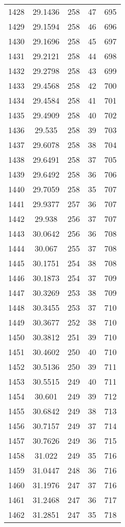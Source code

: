 \documentclass[12pt,a4paper]{article}
\begin{document}
\begin{tabular}{r|cccc}
	1428 & 29.1436 & 258 & 47 & 695 \\
	1429 & 29.1594 & 258 & 46 & 696 \\
	1430 & 29.1696 & 258 & 45 & 697 \\
	1431 & 29.2121 & 258 & 44 & 698 \\
	1432 & 29.2798 & 258 & 43 & 699 \\
	1433 & 29.4568 & 258 & 42 & 700 \\
	1434 & 29.4584 & 258 & 41 & 701 \\
	1435 & 29.4909 & 258 & 40 & 702 \\
	1436 & 29.535 & 258 & 39 & 703 \\
	1437 & 29.6078 & 258 & 38 & 704 \\
	1438 & 29.6491 & 258 & 37 & 705 \\
	1439 & 29.6492 & 258 & 36 & 706 \\
	1440 & 29.7059 & 258 & 35 & 707 \\
	1441 & 29.9377 & 257 & 36 & 707 \\
	1442 & 29.938 & 256 & 37 & 707 \\
	1443 & 30.0642 & 256 & 36 & 708 \\
	1444 & 30.067 & 255 & 37 & 708 \\
	1445 & 30.1751 & 254 & 38 & 708 \\
	1446 & 30.1873 & 254 & 37 & 709 \\
	1447 & 30.3269 & 253 & 38 & 709 \\
	1448 & 30.3455 & 253 & 37 & 710 \\
	1449 & 30.3677 & 252 & 38 & 710 \\
	1450 & 30.3812 & 251 & 39 & 710 \\
	1451 & 30.4602 & 250 & 40 & 710 \\
	1452 & 30.5136 & 250 & 39 & 711 \\
	1453 & 30.5515 & 249 & 40 & 711 \\
	1454 & 30.601 & 249 & 39 & 712 \\
	1455 & 30.6842 & 249 & 38 & 713 \\
	1456 & 30.7157 & 249 & 37 & 714 \\
	1457 & 30.7626 & 249 & 36 & 715 \\
	1458 & 31.022 & 249 & 35 & 716 \\
	1459 & 31.0447 & 248 & 36 & 716 \\
	1460 & 31.1976 & 247 & 37 & 716 \\
	1461 & 31.2468 & 247 & 36 & 717 \\
	1462 & 31.2851 & 247 & 35 & 718 \\

\end{tabular}
\end{document}
